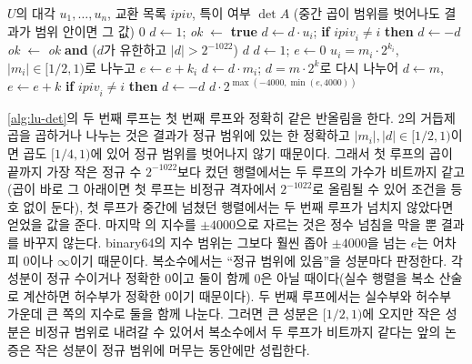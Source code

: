 \begin{algorithm}[htbp]
\begin{algorithmic}[1]
\Require $U$의 대각 $u_1,\dots,u_n$, 교환 목록 $\mathit{ipiv}$, 특이 여부
\Ensure $\det A$ (중간 곱이 범위를 벗어나도 결과가 범위 안이면 그 값)
 \Return $0$ \EndIf
\State $d\gets1$; \textit{ok} $\gets$ \textbf{true}
  \State $d\gets d\cdot u_i$; \textbf{if} $\mathit{ipiv}_i\ne i$ \textbf{then} $d\gets-d$
  \State \textit{ok} $\gets$ \textit{ok} \textbf{and} ($d$가 유한하고 $|d|>2^{-1022}$) 
\EndFor
{} \Return $d$ \EndIf {}
\State $d\gets1$; $e\gets0$ 
  \State $u_i=m_i\cdot2^{k_i}$, $|m_i|\in[1/2,1)$로 나누고 $e\gets e+k_i$ 
  \State $d\gets d\cdot m_i$; $d=m\cdot2^{k}$로 다시 나누어 $d\gets m$, $e\gets e+k$
  \State \textbf{if} $\mathit{ipiv}_i\ne i$ \textbf{then} $d\gets-d$
\EndFor
\State \Return $d\cdot2^{\max(-4000,\min(e,4000))}$ 
\end{algorithmic}
\caption{넘침을 피하는 행렬식 (stardust 의 )}
\label{alg:lu-det}
\end{algorithm}

\cref{alg:lu-det}의 두 번째 루프는 첫 번째 루프와 정확히 같은 반올림을 한다. 2의 거듭제곱을 곱하거나 나누는 것은 결과가 정규 범위에 있는 한 정확하고 $|m_i|,|d|\in[1/2,1)$이면 곱도 $[1/4,1)$에 있어 정규 범위를 벗어나지 않기 때문이다. 그래서 첫 루프의 곱이 끝까지 가장 작은 정규 수 $2^{-1022}$보다 컸던 행렬에서는 두 루프의 가수가 비트까지 같고(곱이 바로 그 아래이면 첫 루프는 비정규 격자에서 $2^{-1022}$로 올림될 수 있어 조건을 등호 없이 둔다), 첫 루프가 중간에 넘쳤던 행렬에서는 두 번째 루프가 넘치지 않았다면 얻었을 값을 준다. 마지막 의 지수를 $\pm4000$으로 자르는 것은 정수 넘침을 막을 뿐 결과를 바꾸지 않는다. binary64의 지수 범위는 그보다 훨씬 좁아 $\pm4000$을 넘는 $e$는 어차피 $0$이나 $\infty$이기 때문이다. 복소수에서는 ``정규 범위에 있음''을 성분마다 판정한다. 각 성분이 정규 수이거나 정확한 $0$이고 둘이 함께 $0$은 아닐 때이다(실수 행렬을 복소 산술로 계산하면 허수부가 정확한 $0$이기 때문이다). 두 번째 루프에서는 실수부와 허수부 가운데 큰 쪽의 지수로 둘을 함께 나눈다. 그러면 큰 성분은 $[1/2,1)$에 오지만 작은 성분은 비정규 범위로 내려갈 수 있어서 복소수에서 두 루프가 비트까지 같다는 앞의 논증은 작은 성분이 정규 범위에 머무는 동안에만 성립한다.

